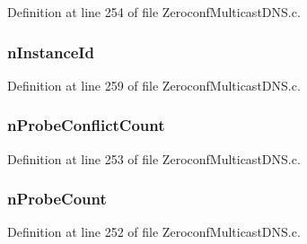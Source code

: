 Definition at line 254 of file Zeroconf\+Multicast\+D\+N\+S.\+c.

\hypertarget{struct__m_d_n_s_process_ctx__common_a1215d8072e91f88afc3d2fbbc5e469a6}{}
\subsubsection[{n\+Instance\+Id}]{ n\+Instance\+Id}\label{struct__m_d_n_s_process_ctx__common_a1215d8072e91f88afc3d2fbbc5e469a6}


Definition at line 259 of file Zeroconf\+Multicast\+D\+N\+S.\+c.

\hypertarget{struct__m_d_n_s_process_ctx__common_aa9900bcbea653f160eb721f777b1f203}{}
\subsubsection[{n\+Probe\+Conflict\+Count}]{ n\+Probe\+Conflict\+Count}\label{struct__m_d_n_s_process_ctx__common_aa9900bcbea653f160eb721f777b1f203}


Definition at line 253 of file Zeroconf\+Multicast\+D\+N\+S.\+c.

\hypertarget{struct__m_d_n_s_process_ctx__common_a548d5c1faecad090ecdce204e9c174f0}{}
\subsubsection[{n\+Probe\+Count}]{ n\+Probe\+Count}\label{struct__m_d_n_s_process_ctx__common_a548d5c1faecad090ecdce204e9c174f0}


Definition at line 252 of file Zeroconf\+Multicast\+D\+N\+S.\+c.

